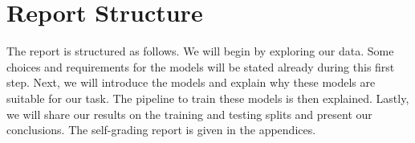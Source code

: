 \section{Report Structure}

The report is structured as follows. We will begin by exploring our data. Some choices and requirements for the models will be stated already during this first step. Next, we will introduce the models and explain why these models are suitable for our task. The pipeline to train these models is then explained. Lastly, we will share our results on the training and testing splits and present our conclusions. The self-grading report is given in the appendices.
